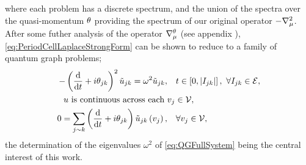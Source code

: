 where each problem has a discrete spectrum, and the union of the spectra over the quasi-momentum $\theta$ providing the spectrum of our original operator $-\nabla_{\mu}^2$.
After some futher analysis of the operator $\nabla^{\theta}_{\mu}$ (see appendix ), \eqref{eq:PeriodCellLaplaceStrongForm} can be shown to reduce to a family of quantum graph problems;
\begin{subequations} \label{eq:QGFullSystem}
	\begin{align}
		-\left( \dfrac{\mathrm{d}}{\mathrm{d}t} + i\theta_{jk} \right)^2 \tilde{u}_{jk} = \omega^2 \tilde{u}_{jk}, &\quad t\in\left[ 0,\left\lvert I_{jk} \right\rvert \right], \ \forall I_{jk}\in \mathcal{E}, \label{eq:QGEdgeODEs} \\
		u \text{ is continuous across each } &v_j \in \mathcal{V}, \label{eq:QGVertCty }\\
		0 = \sum_{j\sim k}\left( \dfrac{\mathrm{d}}{\mathrm{d}t} + i\theta_{jk} \right)\tilde{u}_{jk}\left( v_j \right), &\quad \forall v_j \in \mathcal{V}, \label{eq:QGDerivCondition}
	\end{align}
\end{subequations}
the determination of the eigenvalues $\omega^2$ of \eqref{eq:QGFullSystem} being the central interest of this work.
